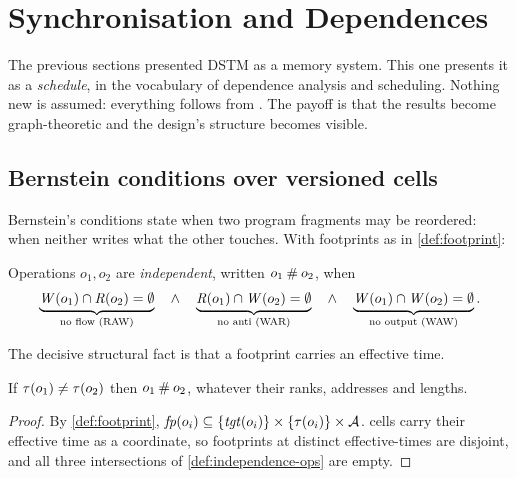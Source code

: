 \section{Synchronisation and Dependences}
\label{sec:sync}

The previous sections presented DSTM as a memory system. This one presents it
as a \emph{schedule}, in the vocabulary of dependence analysis and scheduling.
Nothing new is assumed: everything follows from
. The payoff is that the results become
graph-theoretic and the design's structure becomes visible.

\subsection{Bernstein conditions over versioned cells}
\label{sec:sync-bernstein}

Bernstein's conditions \cite{bernstein1966} state when two program fragments
may be reordered: when neither writes what the other touches. With footprints
as in \cref{def:footprint}:

\begin{definition}[Independence]\label{def:independence-ops}
Operations $o_1, o_2$ are \emph{independent}, written
$o_1 \mathbin{\#} o_2$, when
\[
  \underbrace{\mathit{W}(o_1) \cap \mathit{R}(o_2) = \emptyset}_{\text{no flow (RAW)}}
  \quad\wedge\quad
  \underbrace{\mathit{R}(o_1) \cap \mathit{W}(o_2) = \emptyset}_{\text{no anti (WAR)}}
  \quad\wedge\quad
  \underbrace{\mathit{W}(o_1) \cap \mathit{W}(o_2) = \emptyset}_{\text{no output (WAW)}} .
\]
\end{definition}

The decisive structural fact is that a footprint carries an effective time.

\begin{theorem}\label{thm:renaming}
If $\tau(o_1) \ne \tau(o_2)$ then $o_1 \mathbin{\#} o_2$, whatever their
\glspl{rank}, addresses and lengths.
\end{theorem}

\begin{proof}
By \cref{def:footprint}, $\mathit{fp}(o_i) \subseteq \{\mathit{tgt}(o_i)\} \times
\{\tau(o_i)\} \times \mathcal{A}$. \Glspl{cell} carry their effective time as a
coordinate, so footprints at distinct \glspl{effective-time} are disjoint, and all
three intersections of \cref{def:independence-ops} are empty.
\end{proof}

